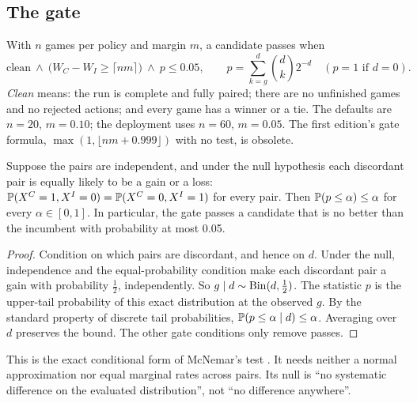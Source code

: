 \subsection{The gate}
With $n$ games per policy and margin $m$, a candidate passes when
\begin{equation}
  \text{clean}\ \wedge\ \big(W_C-W_I\ge\lceil nm\rceil\big)\ \wedge\
  p\le0.05,\qquad
  p=\sum_{k=g}^{d}\binom dk2^{-d}\quad(p=1\text{ if }d=0).
  \label{eq:gate}
\end{equation}
\emph{Clean} means: the run is complete and fully paired; there are no
unfinished games and no rejected actions; and every game has a winner or a
tie. The defaults are $n=20$, $m=0.10$; the deployment uses $n=60$, $m=0.05$.
The first edition's gate formula, $\max(1,\lfloor nm+0.999\rfloor)$ with no
test, is obsolete.

\begin{proposition}
\label{prop:signtest}
Suppose the pairs are independent, and under the null hypothesis each
discordant pair is equally likely to be a gain or a loss:
$\mathbb{P}(X^C=1,X^I=0)=\mathbb{P}(X^C=0,X^I=1)$ for every pair. Then
$\mathbb{P}(p\le\alpha)\le\alpha$ for every $\alpha\in[0,1]$. In particular, the
gate passes a candidate that is no better than the incumbent with
probability at most 0.05.
\end{proposition}
\begin{proof}
Condition on which pairs are discordant, and hence on $d$. Under the null,
independence and the equal-probability condition make each discordant pair a
gain with probability $\tfrac12$, independently. So $g\mid d\sim\operatorname{Bin}(d,\tfrac12)$.
The statistic $p$ is the upper-tail probability of this exact distribution at
the observed $g$. By the standard property of discrete tail probabilities,
$\mathbb{P}(p\le\alpha\mid d)\le\alpha$. Averaging over $d$ preserves the bound.
The other gate conditions only remove passes.
\end{proof}

This is the exact conditional form of McNemar's test \citep{mcnemar}. It needs
neither a normal approximation nor equal marginal rates across pairs. Its
null is ``no systematic difference on the evaluated distribution'', not ``no
difference anywhere''.

